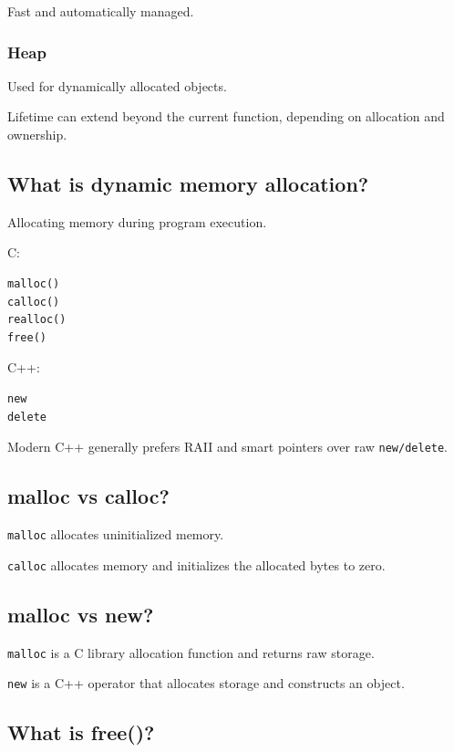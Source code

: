 Fast and automatically managed.

\subsubsection{Heap}

Used for dynamically allocated objects.

Lifetime can extend beyond the current function, depending on allocation and ownership.

\medskip

\subsection{What is dynamic memory allocation?}

Allocating memory during program execution.

C:

\begin{lstlisting}
malloc()
calloc()
realloc()
free()
\end{lstlisting}

C++:

\begin{lstlisting}
new
delete
\end{lstlisting}

Modern C++ generally prefers RAII and smart pointers over raw \texttt{new/delete}.

\medskip

\subsection{malloc vs calloc?}

\texttt{malloc} allocates uninitialized memory.

\texttt{calloc} allocates memory and initializes the allocated bytes to zero.

\medskip

\subsection{malloc vs new?}

\texttt{malloc} is a C library allocation function and returns raw storage.

\texttt{new} is a C++ operator that allocates storage and constructs an object.

\medskip

\subsection{What is free()?}

